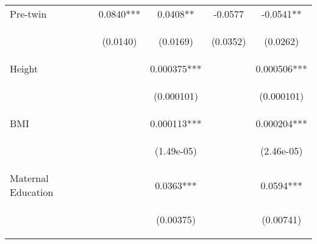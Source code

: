 \documentclass{article}[11pt,subeqn]
\begin{document}
\begin{spacing}{1.5}
\begin{table}
\begin{center}
\begin{tabular}{lcccc}
Pre-twin	&	0.0840***	&	0.0408**	&	-0.0577	&	-0.0541**	\\   
\vspace{4pt}	& \begin{footnotesize}	(0.0140)	\end{footnotesize} & \begin{footnotesize}	(0.0169)	\end{footnotesize} & \begin{footnotesize}	(0.0352)	\end{footnotesize} & \begin{footnotesize}	(0.0262)	\end{footnotesize} \\
Height	&		&	0.000375***	&		&	0.000506***	\\   
\vspace{4pt}	& \begin{footnotesize}		\end{footnotesize} & \begin{footnotesize}	(0.000101)	\end{footnotesize} & \begin{footnotesize}		\end{footnotesize} & \begin{footnotesize}	(0.000101)	\end{footnotesize} \\
BMI	&		&	0.000113***	&		&	0.000204***	\\   
\vspace{4pt}	& \begin{footnotesize}		\end{footnotesize} & \begin{footnotesize}	(1.49e-05)	\end{footnotesize} & \begin{footnotesize}		\end{footnotesize} & \begin{footnotesize}	(2.46e-05)	\end{footnotesize} \\
Maternal Education	&		&	0.0363***	&		&	0.0594***	\\   
\vspace{4pt}	& \begin{footnotesize}		\end{footnotesize} & \begin{footnotesize}	(0.00375)	\end{footnotesize} & \begin{footnotesize}		\end{footnotesize} & \begin{footnotesize}	(0.00741)	\end{footnotesize} \\

\end{tabular}
\end{center}
\end{table}
\end{spacing}
\end{document}
